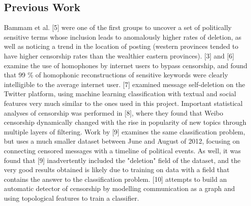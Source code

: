 \documentclass{article} %
\begin{document}
\begin{CJK*}{UTF8}{gbsn}
\section{Previous Work}

Bammam et al. [5] were one of the first groups to uncover a set of politically sensitive terms whose inclusion leads to anomalously higher rates of deletion, as well as noticing a trend in the location of posting (western provinces tended to have higher censorship rates than the wealthier eastern provinces). [3] and [6] examine the use of homophones by internet users to bypass censorship, and found that 99 \% of homophonic reconstructions of sensitive keywords were clearly intelligible to the average internet user. [7] examined message self-deletion on the Twitter platform, using machine learning classification with textual and social features very much similar to the ones used in this project. Important statistical analyses of censorship was performed in [8], where they found that Weibo censorship dynamically changed with the rise in popularity of new topics through multiple layers of filtering. Work by [9] examines the same classification problem, but uses a much smaller dataset between June and August of 2012, focusing on connecting censored messages with a timeline of political events. As well, it was found that [9] inadvertently included the "deletion" field of the dataset, and the very good results obtained is likely due to training on data with a field that contains the answer to the classification problem. [10] attempts to build an automatic detector of censorship by modelling communication as a graph and using topological features to train a classifier. 


\end{CJK*}
\end{document}
